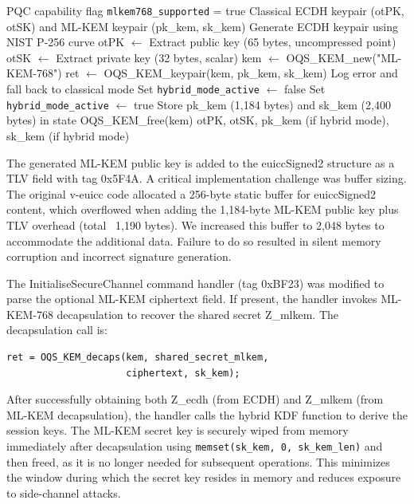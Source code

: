 \documentclass{easychair}
\begin{document}
\begin{algorithm}[h]
\caption{Hybrid Keypair Generation (eUICC)}
\label{alg:keygen}
\begin{algorithmic}[1]
\REQUIRE PQC capability flag \texttt{mlkem768\_supported} = true
\ENSURE Classical ECDH keypair (otPK, otSK) and ML-KEM keypair (pk\_kem, sk\_kem)
\STATE Generate ECDH keypair using NIST P-256 curve
\STATE otPK $\leftarrow$ Extract public key (65 bytes, uncompressed point)
\STATE otSK $\leftarrow$ Extract private key (32 bytes, scalar)
    \STATE kem $\leftarrow$ OQS\_KEM\_new("ML-KEM-768")
    \STATE ret $\leftarrow$ OQS\_KEM\_keypair(kem, pk\_kem, sk\_kem)
        \STATE Log error and fall back to classical mode
        \STATE Set \texttt{hybrid\_mode\_active} $\leftarrow$ false
    \ELSE
        \STATE Set \texttt{hybrid\_mode\_active} $\leftarrow$ true
        \STATE Store pk\_kem (1,184 bytes) and sk\_kem (2,400 bytes) in state
    \ENDIF
    \STATE OQS\_KEM\_free(kem)
\ENDIF
\RETURN otPK, otSK, pk\_kem (if hybrid mode), sk\_kem (if hybrid mode)
\end{algorithmic}
\end{algorithm}

The generated ML-KEM public key is added to the euiccSigned2 structure as a TLV field with tag 0x5F4A. A critical implementation challenge was buffer sizing. The original v-euicc code allocated a 256-byte static buffer for euiccSigned2 content, which overflowed when adding the 1,184-byte ML-KEM public key plus TLV overhead (total ~1,190 bytes). We increased this buffer to 2,048 bytes to accommodate the additional data. Failure to do so resulted in silent memory corruption and incorrect signature generation.

The InitialiseSecureChannel command handler (tag 0xBF23) was modified to parse the optional ML-KEM ciphertext field. If present, the handler invokes ML-KEM-768 decapsulation to recover the shared secret Z\_mlkem. The decapsulation call is:

\begin{verbatim}
ret = OQS_KEM_decaps(kem, shared_secret_mlkem, 
                     ciphertext, sk_kem);
\end{verbatim}

After successfully obtaining both Z\_ecdh (from ECDH) and Z\_mlkem (from ML-KEM decapsulation), the handler calls the hybrid KDF function to derive the session keys. The ML-KEM secret key is securely wiped from memory immediately after decapsulation using \texttt{memset(sk\_kem, 0, sk\_kem\_len)} and then freed, as it is no longer needed for subsequent operations. This minimizes the window during which the secret key resides in memory and reduces exposure to side-channel attacks.
\end{document}
